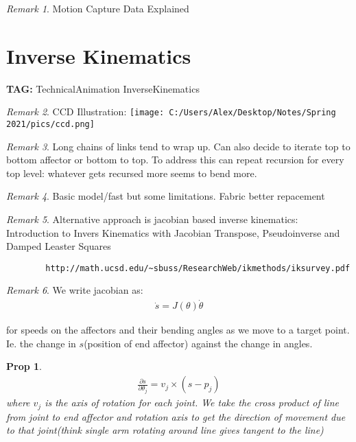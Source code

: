 \documentclass[11pt]{article}
\newtheorem{prop}{Prop}
\theoremstyle{remark}
\newtheorem{remark}{Remark}
\begin{document}
\begin{remark}
	Motion Capture Data Explained
\end{remark}



\section{Inverse Kinematics}

\textbf{TAG:} TechnicalAnimation InverseKinematics

\begin{remark}
	CCD Illustration:
	\texttt{[image: C:/Users/Alex/Desktop/Notes/Spring 2021/pics/ccd.png]}
\end{remark}

\begin{remark}
	Long chains of links tend to wrap up. Can also decide to iterate top to bottom affector or bottom to top. To address this can repeat recursion for every top level: whatever gets recursed more seems to bend more.
\end{remark}

\begin{remark}
	Basic model/fast but some limitations. Fabric better repacement
\end{remark}


\begin{remark}
	Alternative approach is jacobian based inverse kinematics: Introduction to Invers Kinematics with Jacobian Transpose, Pseudoinverse and Damped Leaster Squares
	\begin{verbatim}
		http://math.ucsd.edu/~sbuss/ResearchWeb/ikmethods/iksurvey.pdf
	\end{verbatim}
\end{remark}

\begin{remark}
	We write jacobian as:
	\begin{align*}
		\dot{s} = J(\theta)\dot{\theta}
	\end{align*}

	for speeds on the affectors and their bending angles as we move to a target point. Ie. the change in $s$(position of end affector) against the change in angles.
\end{remark}

\begin{prop}
	\begin{align*}
		\frac{\partial s}{\partial \theta_j} = v_j \times (s - p_j)
	\end{align*}
	where $v_j$ is the axis of rotation for each joint. We take the cross product of line from joint to end affector and rotation axis to get the direction of movement due to that joint(think single arm rotating around line gives tangent to the line)
\end{prop}
\end{document}
